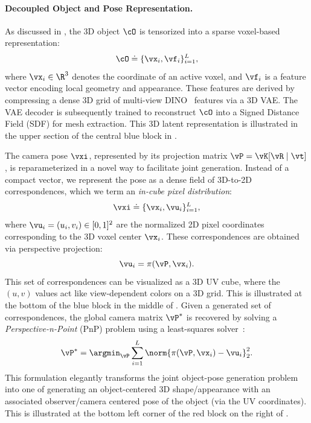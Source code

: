 \documentclass[../../book-main.tex]{subfiles}
\begin{document}
\paragraph{Decoupled Object and Pose Representation.}
As discussed in , the 3D object \(\object\) is tensorized into a sparse voxel-based representation:
\begin{equation}
    \object \doteq \{\point_{i}, \feat_{i}\}_{i=1}^{\numpts} ,
\end{equation}
where \(\point_{i} \in \R^{3}\) denotes the coordinate of an active voxel, and \(\feat_{i}\) is a feature vector encoding local geometry and appearance.
These features are derived by compressing a dense 3D grid of multi-view DINO~\citep{oquab2023dinov2} features via a 3D VAE.
The VAE decoder is subsequently trained to reconstruct \(\object\) into a Signed Distance Field (SDF) for mesh extraction.
This 3D latent representation is illustrated in the upper section of the central blue block in .

The camera pose \(\pose\), represented by its projection matrix
\(\vP = \vK[\vR \mid \vt]\), is reparameterized
in a novel way to facilitate joint generation.
Instead of a compact
vector, we represent the pose as a dense field of 3D-to-2D
correspondences, which we term an \textit{in-cube pixel distribution}:
\begin{equation}
\pose \doteq \{\point_{i}, \pixcoord_{i}\}_{i=1}^{\numpts} ,
\end{equation}
where \(\pixcoord_{i} = (u_{i}, v_{i}) \in [0, 1]^{2}\) are the normalized 2D
pixel coordinates corresponding to the 3D voxel center \(\point_{i}\).
These correspondences are obtained via perspective projection:
\begin{equation}
\pixcoord_{i} = \pi(\vP, \point_{i}) .
\end{equation}
This set of correspondences can be visualized as a 3D UV cube, where
the \((u, v)\) values act like view-dependent colors on a 3D grid.
This is illustrated at the bottom of the blue block in the middle of
.
Given a generated set of correspondences, the global camera matrix
\(\vP^{*}\) is recovered by solving a \textit{Perspective-n-Point}
(PnP) problem using a least-squares solver~\citep{abdel2015direct}:
\begin{equation}\label{eq:pnp}
\vP^{*} = \argmin_{\vP} \sum_{i=1}^{\numpts}
\norm{\pi(\vP, \point_{i}) - \pixcoord_{i}}_{2}^{2} .
\end{equation}
This formulation elegantly transforms the joint object-pose
generation problem into one of generating an object-centered 3D
shape/appearance with an associated observer/camera centered pose of
the object (via the UV coordinates).
This is illustrated at the
bottom left corner of the red block on the right of .
\end{document}
